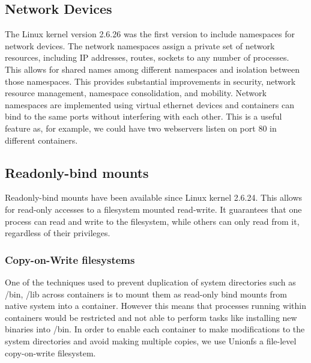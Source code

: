 \subsection{Network Devices}
The Linux kernel version 2.6.26 was the first version to include namespaces for network devices.  The network namespaces assign a private set of network resources, including IP addresses, routes, sockets to any number of processes.  This allows for shared names among different namespaces and isolation between those namespaces.  This provides substantial improvements in security, network resource management, namespace consolidation, and mobility. Network namespaces are implemented using virtual ethernet devices and containers can bind to the same ports without interfering with each other. This is a useful feature as, for example, we could have two webservers listen on port $80$ in different containers.


\subsection{Readonly-bind mounts}
Readonly-bind mounts have been available since Linux kernel 2.6.24.  This allows for read-only accesses to a filesystem mounted read-write.  It guarantees that one process can read and write to the filesystem, while others can only read from it, regardless of their privileges.

\subsubsection{Copy-on-Write filesystems}
One of the techniques used to prevent duplication of system directories such as /bin, /lib across containers is to mount them as read-only bind mounts from native system into a container. However this means that processes running within containers would be restricted and not able to perform tasks like installing new binaries into /bin. In order to enable each container to make modifications to the system directories and avoid making multiple copies, we use Unionfs \cite{tos06unionfs} a file-level copy-on-write filesystem. 

